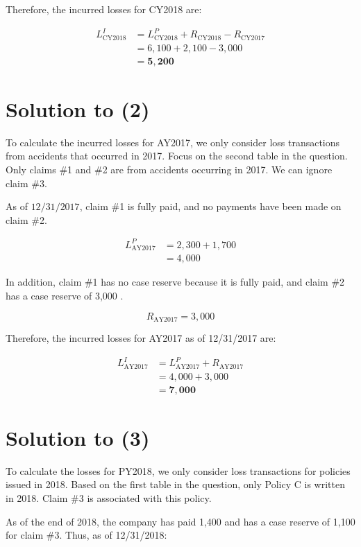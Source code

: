 \documentclass[10pt]{article}
\begin{document}
Therefore, the incurred losses for CY2018 are:

$$
\begin{aligned}
L_{\mathrm{CY} 2018}^{I} & =L_{\mathrm{CY} 2018}^{P}+R_{\mathrm{CY} 2018}-R_{\mathrm{CY} 2017} \\
& =6,100+2,100-3,000 \\
& =\mathbf{5 , 2 0 0}
\end{aligned}
$$

\section{Solution to (2)}
To calculate the incurred losses for AY2017, we only consider loss transactions from accidents that occurred in 2017. Focus on the second table in the question. Only claims \#1 and \#2 are from accidents occurring in 2017. We can ignore claim \#3.

As of $12 / 31 / 2017$, claim \#1 is fully paid, and no payments have been made on claim \#2.

$$
\begin{aligned}
L_{\mathrm{AY} 2017}^{P} & =2,300+1,700 \\
& =4,000
\end{aligned}
$$

In addition, claim \#1 has no case reserve because it is fully paid, and claim \#2 has a case reserve of 3,000 .

$$
R_{\mathrm{AY} 2017}=3,000
$$

Therefore, the incurred losses for AY2017 as of 12/31/2017 are:

$$
\begin{aligned}
L_{\mathrm{AY} 2017}^{I} & =L_{\mathrm{AY} 2017}^{P}+R_{\mathrm{AY} 2017} \\
& =4,000+3,000 \\
& =\mathbf{7 , 0 0 0}
\end{aligned}
$$

\section{Solution to (3)}
To calculate the losses for PY2018, we only consider loss transactions for policies issued in 2018. Based on the first table in the question, only Policy C is written in 2018. Claim \#3 is associated with this policy.

As of the end of 2018, the company has paid 1,400 and has a case reserve of 1,100 for claim \#3. Thus, as of 12/31/2018:
\end{document}
